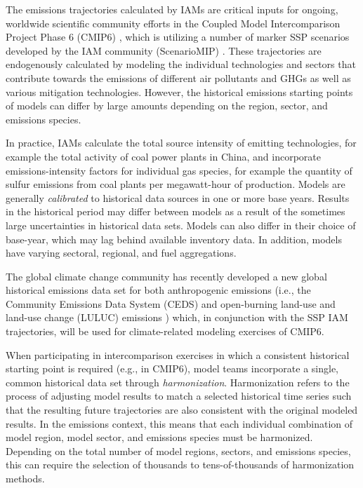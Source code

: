 \documentclass[review]{elsarticle}
\begin{document}
The emissions trajectories calculated by IAMs are critical inputs for ongoing,
worldwide scientific community efforts in the Coupled Model Intercomparison
Project Phase 6 (CMIP6) \cite{eyring_overview_2016}, which is utilizing a number
of marker SSP scenarios developed by the IAM community (ScenarioMIP)
\cite{oneill_scenario_2016}. These trajectories are endogenously calculated by
modeling the individual technologies and sectors that contribute towards the
emissions of different air pollutants and GHGs as well as various mitigation
technologies. However, the historical emissions starting points of models can
differ by large amounts depending on the region, sector, and emissions species.

In practice, IAMs calculate the total source intensity of emitting technologies,
for example the total activity of coal power plants in China, and incorporate
emissions-intensity factors for individual gas species, for example the quantity
of sulfur emissions from coal plants per megawatt-hour of production. Models are
generally \textit{calibrated} to historical data sources in one or more base
years. Results in the historical period may differ between models as a result of
the sometimes large uncertainties in historical data sets. Models can also
differ in their choice of base-year, which may lag behind available inventory
data. In addition, models have varying sectoral, regional, and fuel
aggregations.

The global climate change community has recently developed a new global
historical emissions data set for both anthropogenic emissions (i.e., the
Community Emissions Data System (CEDS) \cite{hoesly_historical_2017} and
open-burning land-use and land-use change (LULUC) emissions
\cite{van_marle_historic_2017}) which, in conjunction with the SSP IAM
trajectories, will be used for climate-related modeling exercises of CMIP6.

When participating in intercomparison exercises in which a consistent historical
starting point is required (e.g., in CMIP6), model teams incorporate a single,
common historical data set through \textit{harmonization}. Harmonization
refers to the process of adjusting model results to match a selected
historical time series such that the resulting future trajectories are also
consistent with the original modeled results. In the emissions context, this
means that each individual combination of model region, model sector, and
emissions species must be harmonized. Depending on the total number of model
regions, sectors, and emissions species, this can require the selection of
thousands to tens-of-thousands of harmonization methods.
\end{document}
